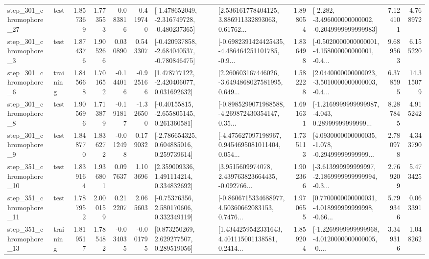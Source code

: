 \begin{tabular}{llrrrrllrlrr}
  step\_301\_chromophore\_27 &      test &      1.857369 &    1.773553 &     -0.083816 & -0.419740 &  [-1.478652049, -2.316749728, -0.480237365] &  [2.536161778404125, 3.886911332893063, 0.61762... &       1.898054 &  [-2.282, -3.496000000000002, -0.2049999999999983] &            7.124101 &          4.768972 \\
   step\_301\_chromophore\_3 &      test &      1.874376 &    1.905266 &      0.030890 &  0.543307 &  [-0.420937858, -2.684040537, -0.780846475] &  [-0.6982391424425435, -4.486464251101785, -0.9... &       1.836498 &  [-0.5020000000000001, -4.158000000000001, -0.4... &            9.689563 &          6.155220 \\
   step\_301\_chromophore\_6 &  training &      1.845668 &    1.701652 &     -0.144016 & -0.925166 &    [1.478777122, -2.420406077, 0.031692632] &  [2.260603167446026, -3.6494868027581995, 0.649... &       1.582228 &  [2.0440000000000023, -3.5010000000000003, -0.4... &            6.378595 &         14.315079 \\
   step\_301\_chromophore\_8 &      test &      1.905696 &    1.713879 &     -0.191817 & -1.326500 &    [-0.40155815, -2.655805145, 0.261360581] &  [-0.8985299071988588, -4.269872430354147, 0.35... &       1.691631 &  [-1.2169999999999987, -4.043, 0.28999999999999... &            8.287845 &          4.915242 \\
   step\_301\_chromophore\_9 &      test &      1.848770 &    1.836272 &     -0.012498 &  0.179032 &    [-2.786654325, 0.604885016, 0.259739614] &  [-4.475627097198967, 0.9454695081011404, 0.054... &       1.735113 &  [4.0930000000000035, -1.078, -0.29499999999999... &            2.780978 &          4.343790 \\
  step\_351\_chromophore\_10 &      test &      1.839164 &    1.936801 &      0.097637 &  1.103696 &     [2.359009336, 1.491114214, 0.334832692] &  [3.9515609974078, 2.439763823664435, -0.092766... &       1.902366 &  [-3.613999999999997, -2.1869999999999994, -0.3... &            2.769209 &          5.473425 \\
  step\_351\_chromophore\_11 &      test &      1.787952 &    2.000159 &      0.212207 &  2.065603 &     [-0.75376356, 2.580170606, 0.332349119] &  [-0.8606715334688977, 4.50360662083153, 0.7476... &       1.970655 &  [0.7700000000000031, -4.018999999999998, -0.66... &            5.799346 &          0.063391 \\
  step\_351\_chromophore\_13 &  training &      1.819517 &    1.785482 &     -0.034035 & -0.001795 &     [0.873250269, 2.629277507, 0.289519056] &  [1.4344259542331643, 4.401115001138581, 0.2414... &       1.859204 &  [-1.2269999999999968, -4.0120000000000005, -0.... &            3.349316 &          1.048262 \\

\end{tabular}
